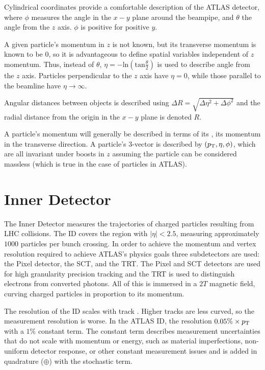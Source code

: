 Cylindrical coordinates provide a comfortable description of the \ac{ATLAS} detector, where $\phi$ measures the angle in the $x-y$ plane around the beampipe, and $\theta$ the angle from the $z$ axis. $\phi$ is positive for positive $y$. 

A given particle's momentum in $z$ is not known, but its transverse momentum is known to be $0$, so it is advantageous to define spatial variables independent of $z$ momentum. Thus, instead of $\theta$, $\eta = - \textrm{ln}(\textrm{tan}\frac{\theta}{2})$ is used to describe angle from the $z$ axis. Particles perpendicular to the $z$ axis have $\eta = 0$, while those parallel to the beamline have $\eta \rightarrow \infty$. 

Angular distances between objects is described using $\Delta R = \sqrt{\Delta \eta ^2 + \Delta \phi ^2}$ and the radial distance from the origin in the $x-y$ plane is denoted $R$. 

A particle's momentum will generally be described in terms of its \pT, its momentum in the transverse direction. A particle's $3$-vector is described by $(p_{\text{T}}, \eta, \phi)$, which are all invariant under boosts in $z$ assuming the particle can be considered massless (which is true in the case of particles in \ac{ATLAS}).





\section{Inner Detector}
The Inner Detector measures the trajectories of charged particles resulting from \ac{LHC} collisions. The \ac{ID} covers the region with $|\eta| < 2.5$, measuring approximately $1000$ particles per bunch crossing. In order to achieve the momentum and vertex resolution required to achieve \ac{ATLAS}'s physics goals three subdetectors are used: the Pixel detector, the \ac{SCT}, and the \ac{TRT}. The Pixel and \ac{SCT} detectors are used for high granularity precision tracking and the \ac{TRT} is used to distinguish electrons from converted photons. All of this is immersed in a $2T$ magnetic field, curving charged particles in proportion to its momentum.



The \pt resolution of the \ac{ID} scales with track \pt. Higher \pt tracks are less curved, so the measurement resolution is worse. In the \ac{ATLAS} \ac{ID}, the \pt resolution  $0.05\% \times p_{\text{T}}$ with a $1\%$ constant term. The constant term describes measurement uncertainties that do not scale with momentum or energy, such as material imperfections, non-uniform detector response, or other constant measurement issues and is added in quadrature ($\oplus$) with the stochastic term.


